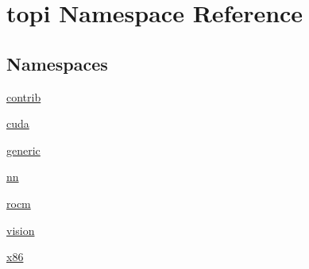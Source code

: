 \hypertarget{namespacetopi}{}\section{topi Namespace Reference}
\label{namespacetopi}
\subsection*{Namespaces}
\begin{DoxyCompactItemize}
\item 
 \hyperlink{namespacetopi_1_1contrib}{contrib}
\item 
 \hyperlink{namespacetopi_1_1cuda}{cuda}
\item 
 \hyperlink{namespacetopi_1_1generic}{generic}
\item 
 \hyperlink{namespacetopi_1_1nn}{nn}
\item 
 \hyperlink{namespacetopi_1_1rocm}{rocm}
\item 
 \hyperlink{namespacetopi_1_1vision}{vision}
\item 
 \hyperlink{namespacetopi_1_1x86}{x86}
\end{DoxyCompactItemize}
